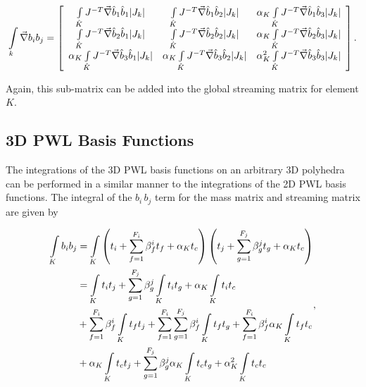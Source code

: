 \begin{equation}
\label{eq::App_BF_2D_streamterm_littlemat}
\int\displaylimits_k \vec{\nabla} b_i b_j =\left[
\begin{array}{ccc}
\int\limits_{\hat{K}} J^{-T}\vec{\nabla}  \hat{b}_1 \hat{b}_1 |J_k| & \int\limits_{\hat{K}}J^{-T}\vec{\nabla} \hat{b}_1 \hat{b}_2 |J_k| & \alpha_K \int\limits_{\hat{K}} J^{-T}\vec{\nabla}\hat{b}_1 \hat{b}_3 |J_k| \\
\int\limits_{\hat{K}} J^{-T}\vec{\nabla}\hat{b}_2 \hat{b}_1 |J_k| & \int\limits_{\hat{K}}J^{-T}\vec{\nabla} \hat{b}_2 \hat{b}_2 |J_k| & \alpha_K \int\limits_{\hat{K}} J^{-T}\vec{\nabla} \hat{b}_2 \hat{b}_3 |J_k|  \\
\alpha_K \int\limits_{\hat{K}} J^{-T}\vec{\nabla}\hat{b}_3 \hat{b}_1 |J_k| &\alpha_K  \int\limits_{\hat{K}}J^{-T}\vec{\nabla} \hat{b}_3\hat{b}_2 |J_k| & \alpha_K^2 \int\limits_{\hat{K}} J^{-T}\vec{\nabla} \hat{b}_3 \hat{b}_3 |J_k| 
\end{array} \right] .
\end{equation}

\noindent Again, this sub-matrix can be added into the global streaming matrix for element $K$.

\subsection{3D PWL Basis Functions}
\label{sec::appendix_BF_PWLInt_3D}

The integrations of the 3D PWL basis functions on an arbitrary 3D polyhedra can be performed in a similar manner to the integrations of the 2D PWL basis functions. The integral of the $b_i \, b_j$ term for the mass matrix and streaming matrix are given by 

\begin{equation}
\label{eq::App_BF_3D_triref_massterm}
\begin{aligned}
\int\displaylimits_K b_i b_j &= \int\displaylimits_K \left( t_i +\sum_{f=1}^{F_i} \beta_f^i  t_f + \alpha_K t_c  \right) \left(  t_j+\sum_{g=1}^{F_j} \beta_g^j  t_g  + \alpha_K t_c \right) \\
&= \int\displaylimits_K t_i t_j +\sum_{g=1}^{F_j} \beta_g^j  \int\displaylimits_K t_i t_g + \alpha_K \int\displaylimits_K t_i t_c  \\
&+  \sum_{f=1}^{F_i} \beta_f^i \int\displaylimits_K t_f t_j   + \sum_{f=1}^{F_i} \sum_{g=1}^{F_j} \beta_f^i    \int\displaylimits_K  t_f t_g+ \sum_{f=1}^{F_i} \beta_f^i \alpha_K \int\displaylimits_K t_f t_c \\
&+  \alpha_K \int\displaylimits_K  t_c t_j + \sum_{g=1}^{F_j}\beta_g^j  \alpha_K  \int\displaylimits_K t_c t_g   +  \alpha_K^2  \int\displaylimits_K t_c t_c
\end{aligned},
\end{equation}

